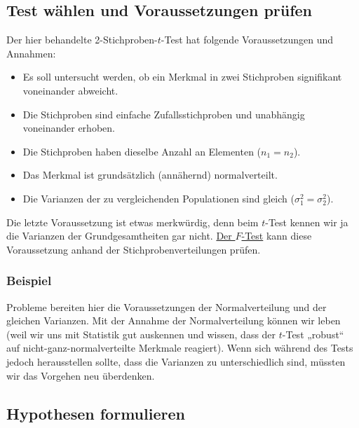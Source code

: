 \documentclass[
  11pt,
  ngerman,
  a4paper,
]{report}
\providecommand{\tightlist}{%
  \setlength{\itemsep}{0pt}\setlength{\parskip}{0pt}}
\begin{document}
\hypertarget{test-wuxe4hlen-und-voraussetzungen-pruxfcfen-2}{%
\subsection{Test wählen und Voraussetzungen prüfen}\label{test-wuxe4hlen-und-voraussetzungen-pruxfcfen-2}}

Der hier behandelte 2-Stichproben-\(t\)-Test hat folgende Voraussetzungen und Annahmen:

\begin{itemize}
\tightlist
\item
  Es soll untersucht werden, ob ein Merkmal in zwei Stichproben signifikant voneinander abweicht.
\item
  Die Stichproben sind einfache Zufallsstichproben und unabhängig voneinander erhoben.
\item
  Die Stichproben haben dieselbe Anzahl an Elementen (\(n_1=n_2\)).
\item
  Das Merkmal ist grundsätzlich (annähernd) normalverteilt.
\item
  Die Varianzen der zu vergleichenden Populationen sind gleich (\(\sigma^2_1=\sigma^2_2\)).
\end{itemize}

Die letzte Voraussetzung ist etwas merkwürdig, denn beim \(t\)-Test kennen wir ja die Varianzen der Grundgesamtheiten gar nicht. \protect\hyperlink{f-test}{Der \(F\)-Test} kann diese Voraussetzung anhand der Stichprobenverteilungen prüfen.

\hypertarget{beispiel-11}{%
\subsubsection{Beispiel}\label{beispiel-11}}

Probleme bereiten hier die Voraussetzungen der Normalverteilung und der gleichen Varianzen. Mit der Annahme der Normalverteilung können wir leben (weil wir uns mit Statistik gut auskennen und wissen, dass der \(t\)-Test „robust`` auf nicht-ganz-normalverteilte Merkmale reagiert). Wenn sich während des Tests jedoch herausstellen sollte, dass die Varianzen zu unterschiedlich sind, müssten wir das Vorgehen neu überdenken.

\hypertarget{hypothesen-formulieren-2}{%
\subsection{Hypothesen formulieren}\label{hypothesen-formulieren-2}}
\end{document}
